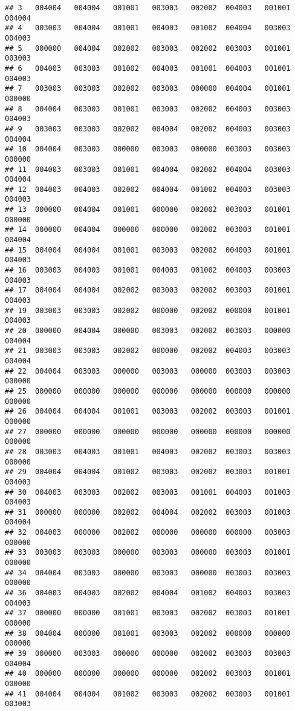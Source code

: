 \documentclass[
]{article}
\begin{document}
\begin{verbatim}
## 3   004004   004004   001001   003003   002002  004003   001001   004004
## 4   003003   004004   001001   004003   001002  004004   003003   004003
## 5   000000   004004   002002   003003   002002  003003   001001   003003
## 6   004003   003003   001002   004003   001001  004003   001001   004003
## 7   003003   003003   002002   003003   000000  004004   001001   000000
## 8   004004   003003   001001   003003   002002  004003   003003   004003
## 9   003003   003003   002002   004004   002002  004003   003003   004004
## 10  004004   003003   000000   003003   000000  003003   003003   000000
## 11  004003   003003   001001   004004   002002  004004   003003   004004
## 12  004003   004003   002002   004004   001002  004003   003003   004003
## 13  000000   004004   001001   000000   002002  003003   001001   000000
## 14  000000   004004   000000   000000   002002  003003   001001   004004
## 15  004004   004004   001001   003003   002002  004003   001001   004003
## 16  003003   004003   001001   004003   001002  004003   003003   004003
## 17  004004   004004   002002   003003   002002  003003   001001   004003
## 19  003003   003003   002002   000000   002002  000000   001001   004003
## 20  000000   004004   000000   003003   002002  003003   000000   004004
## 21  003003   003003   002002   000000   002002  004003   003003   004004
## 22  004004   003003   000000   003003   000000  003003   003003   000000
## 25  000000   000000   000000   000000   000000  000000   000000   000000
## 26  004004   004004   001001   003003   002002  003003   001001   000000
## 27  000000   000000   000000   000000   000000  000000   000000   000000
## 28  003003   004003   001001   004003   002002  003003   003003   000000
## 29  004004   004004   001002   003003   002002  003003   001001   004003
## 30  004003   003003   002002   003003   001001  004003   001003   004003
## 31  000000   000000   002002   004004   002002  003003   001003   004004
## 32  004003   000000   002002   000000   000000  000000   003003   000000
## 33  003003   003003   000000   003003   000000  003003   001001   000000
## 34  004004   003003   000000   003003   000000  003003   003003   000000
## 36  004003   004003   002002   004004   001002  004003   003003   004003
## 37  000000   000000   001001   003003   002002  003003   001001   000000
## 38  004004   000000   001001   003003   002002  000000   000000   000000
## 39  000000   003003   000000   000000   002002  003003   003003   004004
## 40  000000   000000   000000   000000   002002  003003   001001   000000
## 41  004004   004004   001002   003003   002002  003003   001001   003003

\end{verbatim}
\end{document}
